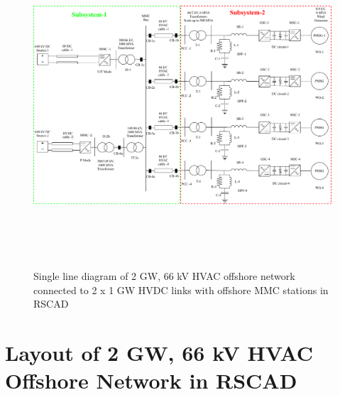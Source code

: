 \begin{figure}[H]
    \includegraphics[height = 12cm,width = \textwidth]{Diagrams/Chapter_4/WT4_MMC2_new.pdf}
    \caption{Single line diagram of 2 GW, 66 kV HVAC offshore network connected to 2 x 1 GW HVDC links with offshore MMC stations in RSCAD}
    \label{fig:WT4_MMC2}
\end{figure}

\section{Layout of 2 GW, 66 kV HVAC Offshore Network in RSCAD}

